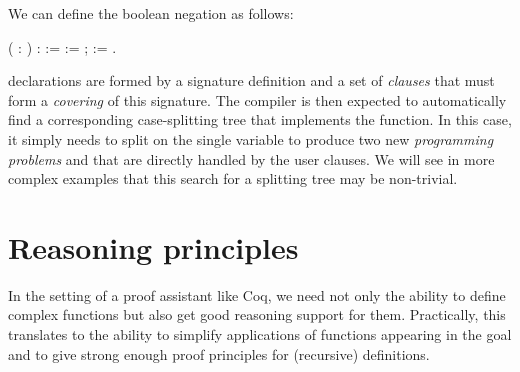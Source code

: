    We can define the boolean negation as follows: \begin{coqdoccode}
\coqdocemptyline
\coqdocnoindent
{}  ( : ) :  :=\coqdoceol
\coqdocnoindent
{}  :=  ;\coqdoceol
\coqdocnoindent
{}  := .\coqdoceol
\coqdocemptyline
\end{coqdoccode}
 declarations are formed by a signature definition and a set of \textit{clauses} 
   that must form a \textit{covering} of this signature. The compiler is then expected to
   automatically find a corresponding case-splitting tree that implements the function.
   In this case, it simply needs to split on the single variable  to
   produce two new \textit{programming problems}   and   that are directly 
   handled by the user clauses. We will see in more complex examples that this search
   for a splitting tree may be non-trivial. 

\section{Reasoning principles}




   In the setting of a proof assistant like Coq, we need not only the ability 
   to define complex functions but also get good reasoning support for them.
   Practically, this translates to the ability to simplify applications of functions 
   appearing in the goal and to give strong enough proof principles for (recursive)
   definitions.


